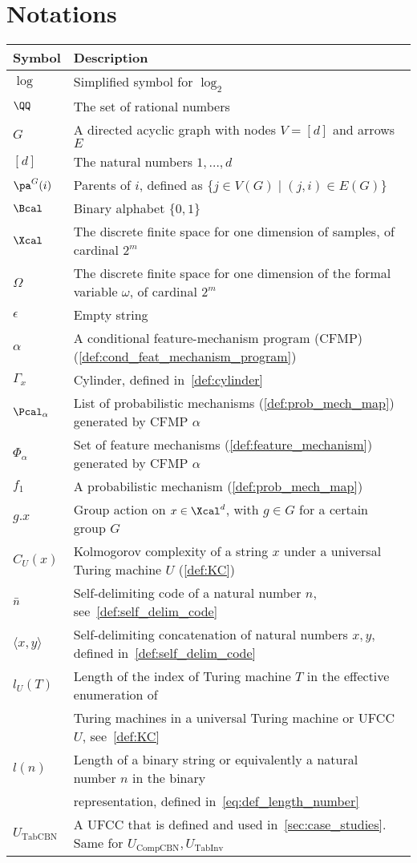 \newpage
\section{Notations}\label{sec:notations}
\begin{table}[h]
\centering
%
\begin{tabular}{ll}
\hline
Symbol & Description \\
\hline
$\log$ & Simplified symbol for $\log_2$\\
$\QQ$ & The set of rational numbers\\
$G$ & A directed acyclic graph
with nodes $V=[d]$ and arrows $E$ \\
$[d]$ & The natural numbers $1, \ldots, d$ \\
$\pa^G(i)$ & Parents of $i$, defined as $\{j\in V(G)\mid (j,i)\in E(G)\}$ \\
$\Bcal$ & Binary alphabet $\{0,1\}$\\
$\Xcal$ & The discrete finite space for one dimension of samples, of cardinal $2^m$\\
$\Omega$ & The discrete finite space for one dimension of the formal variable $\omega$, of cardinal $2^m$\\
$\epsilon$ & Empty string\\
$\alpha$ & A conditional feature-mechanism program (CFMP) (\cref{def:cond_feat_mechanism_program})\\
%
%
$\Gamma_x$ & Cylinder, defined in~\cref{def:cylinder}\\
$\Pcal_\alpha$ & List of probabilistic mechanisms (\cref{def:prob_mech_map}) generated by CFMP $\alpha$\\
$\Phi_\alpha$ & Set of feature mechanisms (\cref{def:feature_mechanism}) generated by CFMP $\alpha$\\
$f_1$ & A probabilistic mechanism (\cref{def:prob_mech_map}) \\
%
$g.x$ & Group action on $x\in\Xcal^d$, with $g\in G$ for a certain group $G$\\
$C_U(x)$ & Kolmogorov complexity of a string $x$ under a universal Turing machine $U$ (\cref{def:KC})\\
$\Bar{n}$ & Self-delimiting code of a natural number $n$, see~\cref{def:self_delim_code}\\
$\langle x,y \rangle$ & Self-delimiting concatenation of natural numbers $x, y$, defined in~\cref{def:self_delim_code}\\
$l_U(T)$ & Length of the index of Turing machine $T$ in the effective enumeration of\\
 & Turing machines in a universal Turing machine or UFCC $U$, see~\cref{def:KC}\\
$l(n)$ & Length of a binary string or equivalently a natural number $n$ in the binary\\
& representation, defined in~\cref{eq:def_length_number}\\
$U_{\text{TabCBN}}$ & A UFCC that is defined and used in~\cref{sec:case_studies}. Same for $U_{\text{CompCBN}}, U_{\text{TabInv}}$\\
%
\hline
\end{tabular}
\end{table}
